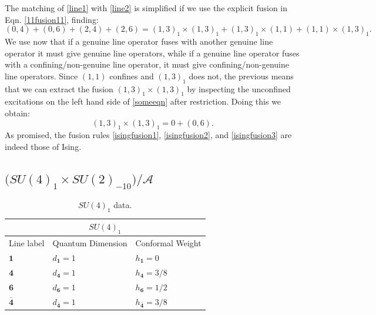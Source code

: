 \documentclass[11pt]{article}
\numberwithin{equation}{section}
\begin{document}
The matching of \eqref{line1} with \eqref{line2} is simplified if we use the explicit fusion in Eqn. \eqref{11fusion11}, finding:
\begin{equation}
    (0,4) + (0,6) + (2,4) + (2,6) = (1,3)_{1} \times (1,3)_{1} + (1,3)_{1} \times (1,1) + (1,1) \times (1,3)_{1}. \label{someeqn}
\end{equation}
We use now that if a genuine line operator fuses with another genuine line operator it must give genuine line operators, while if a genuine line operator fuses with a confining/non-genuine line operator, it must give confining/non-genuine line operators. Since $(1,1)$ confines and $(1,3)_{1}$ does not, the previous means that we can extract the fusion $(1,3)_{1} \times (1,3)_{1}$ by inspecting the unconfined excitations on the left hand side of \eqref{someeqn} after restriction. Doing this we obtain:
\begin{equation}
    (1,3)_{1} \times (1,3)_{1} = 0 + (0,6). \label{isingfusion3}
\end{equation}
As promised, the fusion rules \eqref{isingfusion1}, \eqref{isingfusion2}, and \eqref{isingfusion3} are indeed those of Ising. 



\subsection{$\big( SU(4)_{1} \times SU(2)_{-10}\big)/\mathcal{A}$}
\label{Ising Maverick Duality}

\begin{table}[t]
\centering
\begin{tabular}[h]{|p{4cm}|p{4cm}|p{4cm}| }
\hline 
\multicolumn{3}{|c|}{$SU(4)_{1}$} \\
\hline
Line label & Quantum Dimension & Conformal Weight  \\
\hline
$\mathbf{1}$ & $d_{\mathbf{1}} = 1$ & $h_{\mathbf{1}}=0$ \\
$\mathbf{4}$ & $d_{\mathbf{4}} = 1$ & $h_{\mathbf{4}}=3/8$ \\
$\mathbf{6}$ & $d_{\mathbf{6}} = 1$ & $h_{\mathbf{6}}=1/2$ \\
$\mathbf{\bar{4}}$ & $d_{\mathbf{\bar{4}}} = 1$ & $h_{\mathbf{\bar{4}}}=3/8$ \\
\hline
\end{tabular}
\caption{$SU(4)_{1}$ data.}  \label{su4lv1table}
\end{table}
\end{document}

